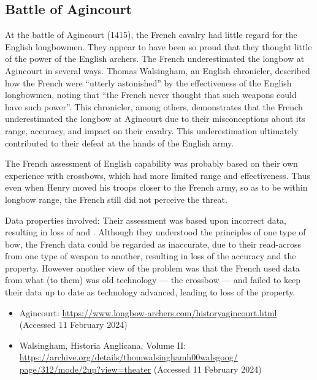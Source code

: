 \subsection{Battle of Agincourt}\label{bkm:incacc:agincourt}
  At the battle of Agincourt (1415), the French cavalry had little regard for the English longbowmen.
  They appear to have been so proud that they thought little of the power of the English
  archers.
  The French underestimated the longbow at Agincourt in several ways.
  Thomas Walsingham, an English chronicler, described how the French were ``utterly astonished''
  by the effectiveness of the English longbowmen,
  noting that ``the French never thought that such weapons could have such power''.
  This chronicler, among others, demonstrates that the French underestimated the longbow at
  Agincourt due to their misconceptions about its range, \gls{accuracy}, and impact on their cavalry.
  This underestimation ultimately contributed to their defeat at the hands of the English army.

  The French assessment of English capability was probably based on their own experience with
  crossbows, which had more limited range and effectiveness. Thus even when Henry moved his troops
  closer to the French army, so as to be within longbow range, the French still did not perceive the threat.

  Data properties involved: Their assessment was based upon incorrect data, resulting in loss of 
   and
  .
  Although they understood the principles of one type of bow, the French data could be regarded as
  inaccurate, due to their read-across from one type of weapon to another, resulting in loss of the
  \gls{accuracy} and the
   property.
  However another view of the problem was that the French used data from what (to them) was old
  technology --- the crossbow --- and failed to keep their data up to date as technology advanced,
  leading to loss of the
   property.

  \begin{itemize}
  \item Agincourt:
  \href{https://www.longbow-archers.com/historyagincourt.html}
       {https://www.longbow-archers.com/historyagincourt.html}
       (Accessed 11 February 2024)
  \item Walsingham, Historia Anglicana, Volume II:
  \href{https://archive.org/details/thomwalsinghamh00walsgoog/page/312/mode/2up?view=theater}
       {https://archive.org/details/thomwalsinghamh00walsgoog/ page/312/mode/2up?view=theater}
       (Accessed 11 February 2024)

\end{itemize}


